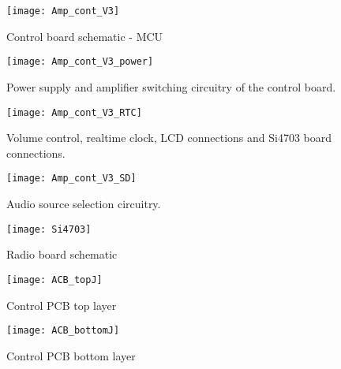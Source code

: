 \documentclass[a4paper,10pt, oneside]{article}
\begin{document}
\begin{figure}[H]
\begin{centering}
	\texttt{[image: Amp\_cont\_V3]}
	\caption{Control board schematic - MCU}\label{MCU}
\end{centering}
\end{figure}

\begin{figure}[H]
\begin{centering}
\vspace*{-2cm}
\hspace*{-1cm}
	\texttt{[image: Amp\_cont\_V3\_power]}
\vspace{-3cm}	
	\caption{Power supply and amplifier switching circuitry of the control board.}\label{power}
\end{centering}	
\end{figure}
\begin{figure}[H]
\begin{centering}
	\texttt{[image: Amp\_cont\_V3\_RTC]}
	\caption{Volume control, realtime clock, LCD connections and Si4703 board connections.}\label{RTC}
\end{centering}	
\end{figure}
\begin{figure}[H]
\begin{centering}
\vspace*{-2cm}
	\texttt{[image: Amp\_cont\_V3\_SD]}	
	\caption{Audio source selection circuitry.}\label{SD}
\end{centering}	
\end{figure}
\begin{figure}[H]
\begin{centering}
	\texttt{[image: Si4703]}
	\caption{Radio board schematic}\label{radio}
\end{centering}	
\end{figure}

\begin{figure}[H]
\begin{centering}
	\texttt{[image: ACB\_topJ]}
	\caption{Control PCB top layer}\label{ACB_top}
\end{centering}	
\end{figure}

\begin{figure}[H]
\begin{centering}
	\texttt{[image: ACB\_bottomJ]}
	\caption{Control PCB bottom layer}\label{ACB_bottom}
\end{centering}	
\end{figure}
\end{document}
